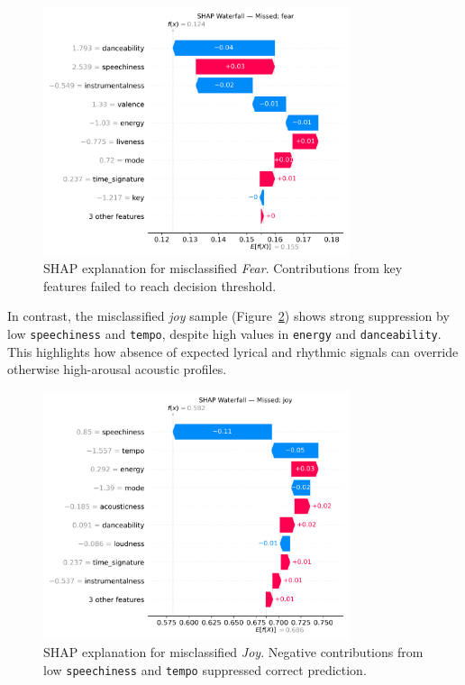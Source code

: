 \documentclass{article}
\begin{document}
\begin{figure}[H]
\centering
\includegraphics[width=0.8\textwidth]{Graphics/shap_missed_labels/fear_missed_shap_waterfall.png}
\caption{SHAP explanation for misclassified \textit{Fear}. Contributions from key features failed to reach decision threshold.}
\label{fig:shap_fear_waterfall}
\end{figure}

In contrast, the misclassified \textit{joy} sample (Figure~\ref{fig:shap_joy_waterfall}) shows strong suppression by low \texttt{speechiness} and \texttt{tempo}, despite high values in \texttt{energy} and \texttt{danceability}. This highlights how absence of expected lyrical and rhythmic signals can override otherwise high-arousal acoustic profiles.

\begin{figure}[H]
\centering
\includegraphics[width=0.8\textwidth]{Graphics/shap_missed_labels/joy_missed_shap_waterfall.png}
\caption{SHAP explanation for misclassified \textit{Joy}. Negative contributions from low \texttt{speechiness} and \texttt{tempo} suppressed correct prediction.}
\label{fig:shap_joy_waterfall}
\end{figure}
\end{document}
